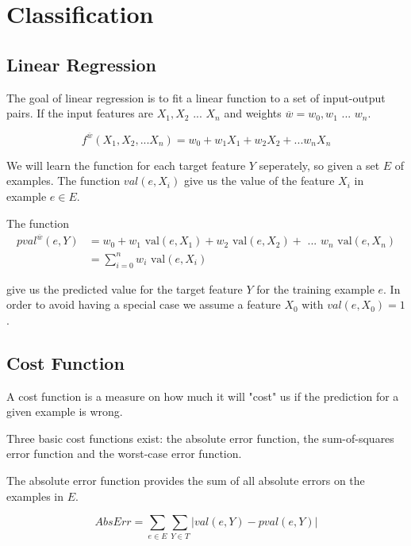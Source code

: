 \section{Classification}\label{sec:classification}



\subsection{Linear Regression}
The goal of linear regression is to fit a linear function to a set of input-output pairs. 
If the input features are $X_1,X_2 \text{ ... } X_n$ and weights $\overline{w} = w_0, w_1 \text{ ... } w_n$.

$$f^{\overline{w}}(X_1,X_2, ... X_n) = w_0 + w_1 X_1 + w_2 X_2 + ... w_n X_n $$ 

We will learn the function for each target feature $Y$ seperately, so given a set $E$ of examples.
The function $val(e,X_i)$ give us the value of the feature $X_i$ in example $e \in E$. 

The function 
\begin{align}
pval^{\overline{w}}(e,Y) &= w_0 + w_1 \text{ val}(e,X_1) + w_2 \text{ val}(e,X_2) + \text{ ... } w_n \text{ val}(e,X_n) \\
&= \sum^n_{i=0} w_i \text{ val}(e,X_i)
\end{align}

give us the predicted value for the target feature $Y$ for the training example $e$.
In order to avoid having a special case we assume a feature $X_0$ with $val(e,X_0)=1$.
\begin{flushright}
\cite[p. 304]{AI2010}
\end{flushright}


\subsection{Cost Function}
A cost function is a measure on how much it will "cost" us if the prediction for a given example is wrong.

Three basic cost functions exist: the absolute error function, the sum-of-squares error function and 
the worst-case error function.
 
The absolute error function provides the sum of all absolute errors on the examples in $E$.

$$AbsErr = \sum_{e \in E}\sum_{Y \in T} |val(e,Y) - pval(e,Y)|$$

